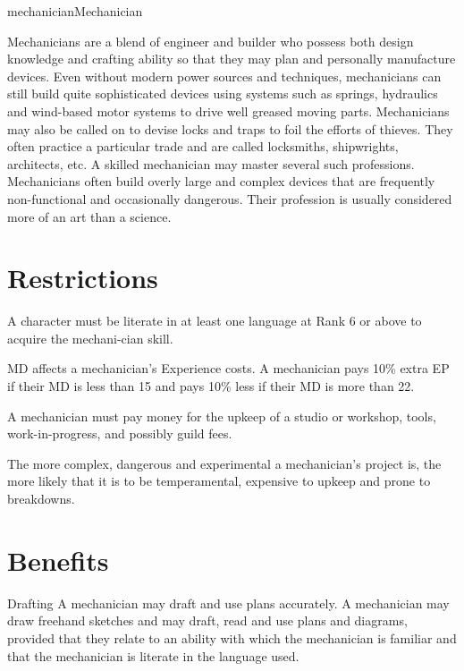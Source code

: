 \begin{Skill}[2.2]{mechanician}{Mechanician}
 
Mechanicians are a blend of engineer and builder who possess both
design knowledge and crafting ability so that they may plan and
personally manufacture devices.  Even without modern power sources
and techniques, mechanicians can still build quite sophisticated
devices using systems such as springs, hydraulics and wind-based motor
systems to drive well greased moving parts.  Mechanicians may also be
called on to devise locks and traps to foil the efforts of thieves.
They often practice a particular trade and are called locksmiths,
shipwrights, architects, etc.  A skilled mechanician may master
several such professions.  Mechanicians often build overly large and
complex devices that are frequently non-functional and occasionally
dangerous. Their profession is usually considered more of an art than
a science.

\section{Restrictions}

A character must be literate in at least one language at Rank 6 or
above to acquire the mechani-cian skill.

MD affects a mechanician’s Experience costs.  A mechanician pays 10\%
extra EP if their MD is less than 15 and pays 10\% less if their MD is
more than 22.

A mechanician must pay money for the upkeep of a studio or workshop,
tools, work-in-progress, and possibly guild fees.

The more complex, dangerous and experimental a mechanician’s project
is, the more likely that it is to be temperamental, expensive to
upkeep and prone to breakdowns.

\section{Benefits}

\begin{Description}
  
\item[Drafting] A mechanician may draft and use plans accurately.  A
  mechanician may draw freehand sketches and may draft, read and use
  plans and diagrams, provided that they relate to an ability with
  which the mechanician is familiar and that the mechanician is
  literate in the language used.


\end{Description}
\end{Skill}
